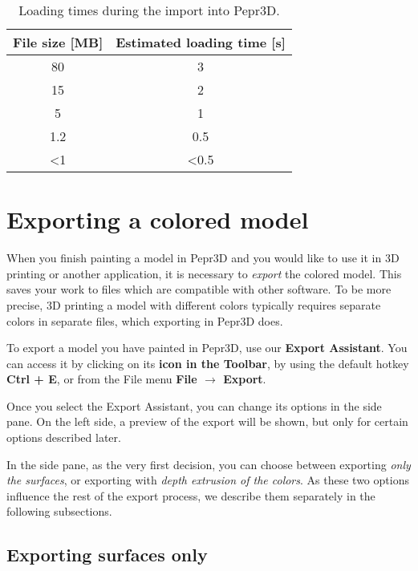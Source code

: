 \begin{table}[]
\centering 
\begin{tabular}{|c|c|}
\hline
\textbf{File size {[}MB{]}} & \textbf{Estimated loading time {[}s{]}} \\ \hline
80                          & 3                                   \\ \hline
15                          & 2                                   \\ \hline
5                           & 1                                   \\ \hline
1.2                         & 0.5                                 \\ \hline
\textless{}1                & \textless{}0.5                      \\ \hline
\end{tabular}
\caption{Loading times during the import into Pepr3D.}
\label{tab:loadperf}
\end{table}

\section{Exporting a colored model}

When you finish painting a model in Pepr3D and you would like to use it in 3D printing or another application, it is necessary to \emph{export} the colored model.
This saves your work to files which are compatible with other software.
To be more precise, 3D printing a model with different colors typically requires separate colors in separate files, which exporting in Pepr3D does.

To export a model you have painted in Pepr3D, use our \textbf{Export Assistant}.
You can access it by clicking on its \textbf{icon in the Toolbar}, by using the default hotkey \textbf{Ctrl + E}, or from the File menu \textbf{File $\rightarrow$ Export}.

Once you select the Export Assistant, you can change its options in the side pane.
On the left side, a preview of the export will be shown, but only for certain options described later.

In the side pane, as the very first decision, you can choose between exporting \emph{only the surfaces}, or exporting with \emph{depth extrusion of the colors}.
As these two options influence the rest of the export process, we describe them separately in the following subsections.

\subsection{Exporting surfaces only}

